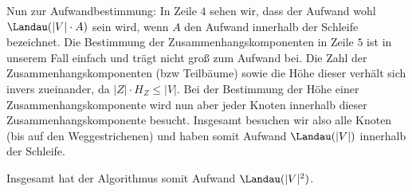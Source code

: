 \begin{solution}
Nun zur Aufwandbestimmung: In Zeile $4$ sehen wir, dass der Aufwand wohl $\Landau(|V| \cdot A)$ sein wird, wenn $A$ den Aufwand innerhalb der Schleife bezeichnet. Die Bestimmung der Zusammenhangskomponenten in Zeile $5$ ist in unserem Fall einfach und trägt nicht groß zum Aufwand bei. Die Zahl der Zusammenhangskomponenten (bzw Teilbäume) sowie die Höhe dieser verhält sich invers zueinander, da $|Z| \cdot H_Z \leq |V|$. Bei der Bestimmung der Höhe einer Zusammenhangskomponente wird nun aber jeder Knoten innerhalb dieser Zusammenhangskomponente besucht. Insgesamt besuchen wir also alle Knoten (bis auf den Weggestrichenen) und haben somit Aufwand $\Landau(|V|)$ innerhalb der Schleife.

Insgesamt hat der Algorithmus somit Aufwand $\Landau(|V|^2)$.
\end{solution}

